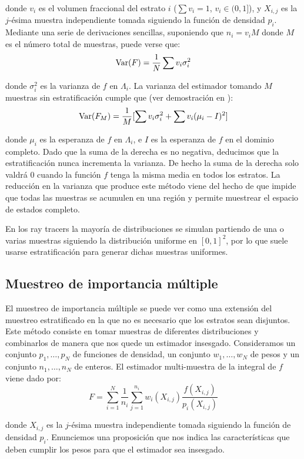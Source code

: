 donde $v_i$ es el volumen fraccional del estrato $i$ ($\sum v_i=1$, $v_i\in (0,1]$), y $X_{i,j}$ es la $j$-ésima muestra independiente tomada siguiendo la función de densidad $p_i$. Mediante una serie de derivaciones sencillas, suponiendo que $n_i = v_i M$ donde $M$ es el número total de muestras, puede verse que:
$$\mathrm{Var}(F) = \frac{1}{N}\sum v_i\sigma_i^2 $$

donde $\sigma_i^2$ es la varianza de $f$ en $\Lambda_i$. La varianza del estimador tomando $M$ muestras sin estratificación cumple que (ver demostración en \cite{Veach97}):
$$\mathrm{Var}(F_M) = \frac{1}{M}[\sum v_i\sigma_i^2 + \sum v_i(\mu_i-I)^2]$$

donde $\mu_i$ es la esperanza de $f$ en $\Lambda_i$, e $I$ es la esperanza de $f$ en el dominio completo. Dado que la suma de la derecha es no negativa, deducimos que la estratificación nunca incrementa la varianza. De hecho la suma de la derecha solo valdrá $0$ cuando la función $f$ tenga la misma media en todos los estratos. La reducción en la varianza que produce este método viene del hecho de que impide que todas las muestras se acumulen en una región y permite muestrear el espacio de estados completo.

En los ray tracers la mayoría de distribuciones se simulan partiendo de una o varias muestras siguiendo la distribución uniforme en $[0,1]^2$, por lo que suele usarse estratificación para generar dichas muestras uniformes.

\subsection{Muestreo de importancia múltiple}

El muestreo de importancia múltiple se puede ver como una extensión del muestreo estratificado en la que no es necesario que los estratos sean disjuntos. Este método consiste en tomar muestras de diferentes distribuciones y combinarlos de manera que nos quede un estimador insesgado. Consideramos un conjunto $p_1,\ldots,p_N$ de funciones de densidad, un conjunto $w_1,\ldots,w_N$ de pesos y un conjunto $n_1,\ldots,n_N$ de enteros. El estimador multi-muestra de la integral de $f$ viene dado por:
\begin{equation}\label{MIS}
F=\sum_{i=1}^N\frac{1}{n_i}\sum_{j=1}^{n_i}w_i(X_{i,j})\frac{f(X_{i,j})}{p_i(X_{i,j})} 
\end{equation}

donde $X_{i,j}$ es la $j$-ésima muestra independiente tomada siguiendo la función de densidad $p_i$. Enunciemos una proposición que nos indica las características que deben cumplir los pesos para que el estimador sea insesgado.

